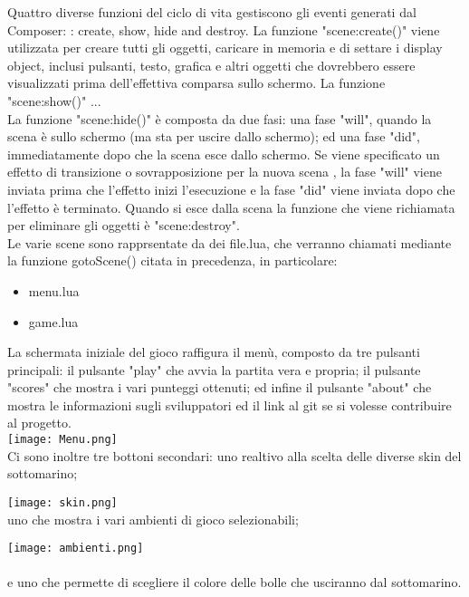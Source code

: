 \documentclass[12pt]{article}
\begin{document}
Quattro diverse funzioni del ciclo di vita gestiscono gli eventi generati dal Composer: : create, show, hide and destroy.
La funzione "scene:create()" viene utilizzata per creare tutti gli oggetti, caricare in memoria e di settare i display object, inclusi pulsanti, testo, grafica e altri oggetti che dovrebbero essere visualizzati prima dell'effettiva comparsa sullo schermo.
La funzione "scene:show()" ... \\
La funzione "scene:hide()" è composta da due fasi: una fase "will", quando la scena è sullo schermo (ma sta per uscire dallo schermo); ed una fase "did", immediatamente dopo che la scena esce dallo schermo. Se viene specificato un effetto di transizione o sovrapposizione per la nuova scena , la fase "will" viene inviata prima che l'effetto inizi l'esecuzione e la fase "did" viene inviata dopo che l'effetto è terminato.
Quando si esce dalla scena la funzione che viene richiamata per eliminare gli oggetti è "scene:destroy". 
\\


Le varie scene sono rapprsentate da dei file.lua, che verranno chiamati mediante la funzione gotoScene() citata in precedenza, in particolare:
\begin{itemize}
    \item menu.lua
    \item game.lua
\end{itemize}



La schermata iniziale del gioco raffigura il menù, composto da tre pulsanti principali: il pulsante "play" che avvia la partita vera e propria; il pulsante "scores" che mostra i vari punteggi ottenuti; ed infine il pulsante "about" che mostra le informazioni sugli sviluppatori ed il link al git se si volesse contribuire al progetto. \\

\texttt{[image: Menu.png]}\\
Ci sono inoltre tre bottoni secondari: uno realtivo alla scelta delle diverse skin del sottomarino; 

\texttt{[image: skin.png]}\\

uno che mostra i vari ambienti di gioco selezionabili; 

\texttt{[image: ambienti.png]}\\
\\
e uno che permette di scegliere il colore delle bolle che usciranno dal sottomarino. 
\\
\end{document}
